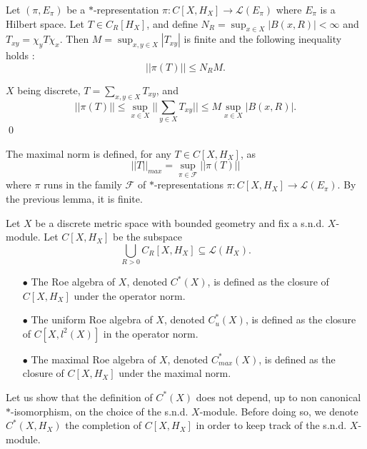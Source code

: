 \begin{lem}
Let $(\pi, E_\pi)$ be a $*$-representation $\pi : C[X,H_X]\rightarrow \mathcal L(E_\pi)$ where $E_\pi$ is a Hilbert space. Let $T\in C_R[H_X]$, and define $N_R =\sup_{x\in X} |B(x,R)|<\infty$ and $T_{xy} = \chi_y T \chi_x$. Then $M=\sup_{x,y\in X} |T_{xy}|$ is finite and the following inequality holds :
\[||\pi(T)||\leq N_R M.\] 
\end{lem}
\begin{dem}
$X$ being discrete, $T=\sum_{x,y\in X} T_{xy}$, and 
\[||\pi(T)||\leq \sup_{x\in X} ||\sum_{y\in X} T_{xy}||\leq M \sup_{x\in X} |B(x,R)|.\]
\qed
\end{dem}

The maximal norm is defined, for any $T\in C[X,H_X]$, as 
\[||T||_{max} = \sup_{\pi\in\mathcal F} ||\pi(T)||\]
where $\pi$ runs in the family $\mathcal F$ of $*$-representations $\pi : C[X,H_X]\rightarrow \mathcal L(E_\pi)$. By the previous lemma, it is finite. 

\begin{definition}
Let $X$ be a discrete metric space with bounded geometry and fix a s.n.d. $X$-module. Let $C[X,H_X] $ be the subspace 
\[\bigcup_{R>0} C_R[X,H_X]\subseteq \mathcal L(H_X).\] 
\begin{itemize}
\item[$\bullet$] The Roe algebra of $X$, denoted $C^*(X)$, is defined as the closure of $C[X,H_X]$ under the operator norm.
\item[$\bullet$] The uniform Roe algebra of $X$, denoted $C_u^*(X)$, is defined as the closure of $C[X,l^2(X)]$ in the operator norm.
\item[$\bullet$] The maximal Roe algebra of $X$, denoted $C_{max}^*(X)$, is defined as the closure of $C[X,H_X]$ under the maximal norm. 
\end{itemize}
\end{definition}

Let us show that the definition of $C^*(X)$ does not depend, up to non canonical $*$-isomorphism, on the choice of the s.n.d. $X$-module. Before doing so, we denote $C^*(X,H_X)$ the completion of $C[X,H_X]$ in order to keep track of the s.n.d. $X$-module.

